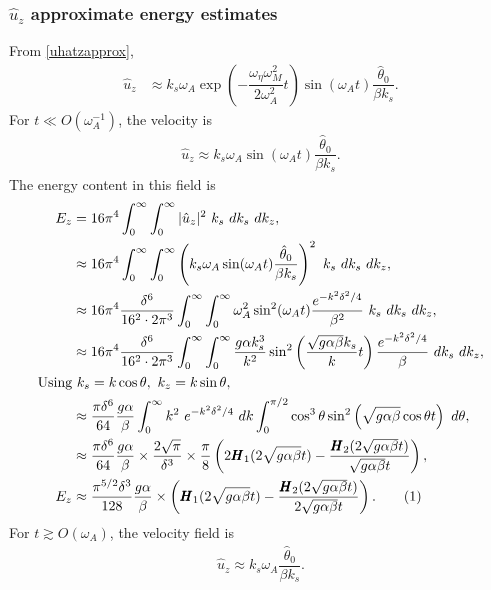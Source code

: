 \documentclass[12pt,psfig]{article}
\newcommand\numberthis{\addtocounter{equation}{1}\tag{\theequation}}
\begin{document}
\subsubsection{$\hat{u}_z$ approximate energy estimates}
From \eqref{uhatzapprox}, 
\begin{align*}
\hat{u}_z&\approx k_s \omega_A \exp\left(-\dfrac{\omega_\eta\omega_M^2}{2\omega_A^2}t\right)\sin(\omega_A t)\dfrac{\hat{\theta}_0}{\beta k_s}.
\end{align*}
For $t\ll O(\omega_A^{-1})$, the velocity is
\begin{align*}
\hat{u}_z\approx k_s \omega_A \sin(\omega_A t)\dfrac{\hat{\theta}_0}{\beta k_s}.
\end{align*}
The energy content in this field is
\begin{align*}
E_z&=16\pi^4\int_{0}^{\infty}\int_{0}^{\infty}|\hat{u}_z|^2 \ k_s \ dk_s \ dk_z,\\
&\approx 16\pi^4\int_{0}^{\infty}\int_{0}^{\infty}\left(k_s \omega_A \sin(\omega_A t)\dfrac{\hat{\theta}_0}{\beta k_s}\right)^2 \ k_s \ dk_s \ dk_z,\\
&\approx 16\pi^4\dfrac{\delta^6}{16^2\cdot 2 \pi^3}\int_{0}^{\infty}\int_{0}^{\infty} \omega_A^2 \sin^2(\omega_A t)\dfrac{e^{-k^2\delta^2/4}}{\beta^2} \ k_s \ dk_s \ dk_z,\\
&\approx 16\pi^4\dfrac{\delta^6}{16^2\cdot 2 \pi^3}\int_{0}^{\infty}\int_{0}^{\infty} \dfrac{g\alpha k_s^3}{k^2} \sin^2\left( \dfrac{\sqrt{g\alpha\beta} k_s}{k}t\right)\dfrac{e^{-k^2\delta^2/4}}{\beta} \ dk_s \ dk_z,\\
\text{Using}& \ k_s=k\cos\theta, \ k_z=k\sin\theta,\\
&\approx \dfrac{\pi\delta^6}{64 }\dfrac{g\alpha}{\beta}\int_{0}^{\infty}k^2 \ e^{-k^2\delta^2/4} \   dk\int_{0}^{\pi/2} \cos^3\theta \sin^2\left( \sqrt{g\alpha\beta}\cos\theta t\right)  \ d\theta,\\
&\approx \dfrac{\pi\delta^6}{64 }\dfrac{g\alpha}{\beta}\times \dfrac{2 \sqrt{\pi }}{\delta^3} \times \dfrac{\pi}{8}   \left(2 \pmb{H}_1(2 \sqrt{g\alpha\beta} t)-\dfrac{\pmb{H}_2(2 \sqrt{g\alpha\beta} t)}{\sqrt{g\alpha\beta} t}\right),\\
E_z&\approx \dfrac{\pi^{5/2}\delta^3}{128}\dfrac{g\alpha}{\beta}\times   \left( \pmb{H}_1(2 \sqrt{g\alpha\beta} t)-\dfrac{\pmb{H}_2(2 \sqrt{g\alpha\beta} t)}{2\sqrt{g\alpha\beta} t}\right). \numberthis \label{Ezstruve}
\end{align*}
For $t\gtrsim O(\omega_A)$, the velocity field is
\begin{align*}
\hat{u}_z\approx k_s \omega_A \dfrac{\hat{\theta}_0}{\beta k_s}.
\end{align*}
\end{document}
